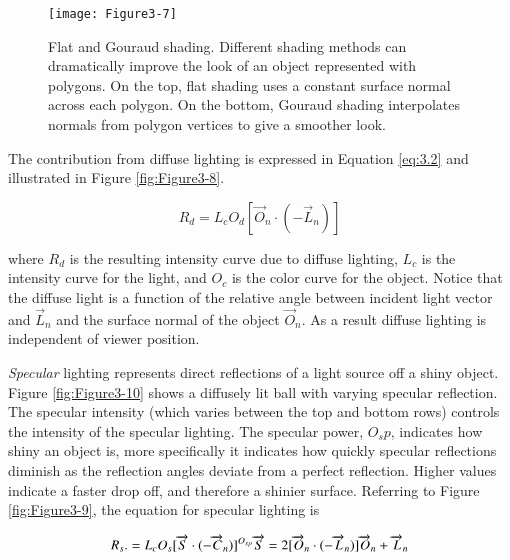 \begin{figure}[!htb]
  \centering
  \texttt{[image: Figure3-7]}\\
  \caption{Flat and Gouraud shading. Different shading methods can dramatically improve the look of an object represented with polygons. On the top, flat shading uses a constant surface normal across each polygon. On the bottom, Gouraud shading interpolates normals from polygon vertices to give a smoother look.}\label{fig:Figure3-7}
\end{figure}

The contribution from diffuse lighting is expressed in Equation \ref{eq:3.2} and illustrated in Figure \ref{fig:Figure3-8}.

\begin{equation}\label{eq:3.2}
  R_d = L_cO_d[\overrightarrow{O}_n \cdot (-\overrightarrow{L}_n)]
\end{equation}

\noindent where $R_d$ is the resulting intensity curve due to diffuse lighting, $L_c$ is the intensity curve for the light, and $O_c$ is the color curve for the object. Notice that the diffuse light is a function of the relative angle between incident light vector and $\overrightarrow{L}_n$ and the surface normal of the object $\overrightarrow{O}_n$. As a result diffuse lighting is independent of viewer position.

\emph{Specular} lighting represents direct reflections of a light source off a shiny object. Figure \ref{fig:Figure3-10} shows a diffusely lit ball with varying specular reflection. The specular intensity (which varies between the top and bottom rows) controls the intensity of the specular lighting. The specular power, $O_sp$, indicates how shiny an object is, more specifically it indicates how quickly specular reflections diminish as the reflection angles deviate from a perfect reflection. Higher values indicate a faster drop off, and therefore a shinier surface. Referring to Figure \ref{fig:Figure3-9}, the equation for specular lighting is

\begin{equation}\label{eq:3.3}
  R_s . = L_cO_s[\overrightarrow{S} \cdot (-\overrightarrow{C}_n)] ^{O_{sp}}\\
\overrightarrow{S} = 2[\overrightarrow{O}_n \cdot (-\overrightarrow{L}_n)]\overrightarrow{O}_n + \overrightarrow{L}_n
\end{equation}

